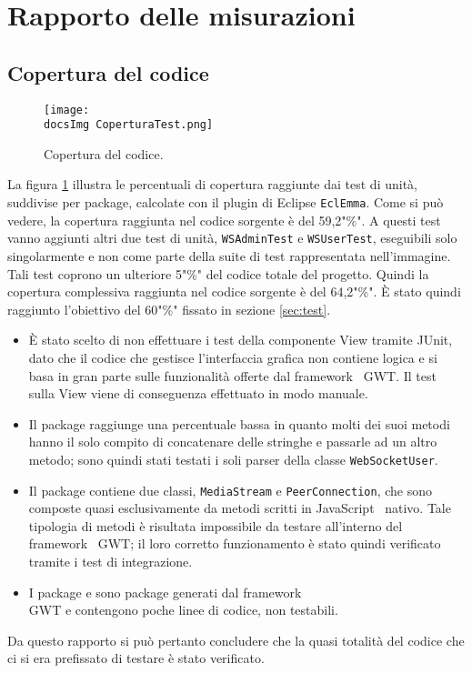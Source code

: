 \section{Rapporto delle misurazioni}{
\subsection{Copertura del codice}

\begin{figure}[h!]
	\centering
	\texttt{[image: \\docsImg CoperturaTest.png]}
	\caption{Copertura del codice.}
	\label{fig:copCod} 
\end{figure}

La figura \ref{fig:copCod} illustra le percentuali di copertura raggiunte dai test di unità, suddivise per package, calcolate con il plugin di Eclipse \texttt{EclEmma}. Come si può vedere, la copertura raggiunta nel codice sorgente è del 59,2"\%". A questi test vanno aggiunti altri due test di unità, \texttt{WSAdminTest} e \texttt{WSUserTest}, eseguibili solo singolarmente e non come parte della suite di test rappresentata nell'immagine. Tali test coprono un ulteriore 5"\%" del codice totale del progetto. Quindi la copertura complessiva raggiunta nel codice sorgente è del 64,2"\%". \`E stato quindi raggiunto l'obiettivo del 60"\%" fissato in sezione \ref{sec:test}.
\begin{itemize}
	\item \`E stato scelto di non effettuare i test della componente View tramite JUnit, dato che il codice che gestisce l'interfaccia grafica non contiene logica e si basa in gran parte sulle funzionalità offerte dal framework\g~ GWT. Il test sulla View viene di conseguenza effettuato in modo manuale.
	\item Il package  raggiunge una percentuale bassa in quanto molti dei suoi metodi hanno il solo compito di concatenare delle stringhe e passarle ad un altro metodo; sono quindi stati testati i soli parser della classe \texttt{WebSocketUser}.
	\item Il package  contiene due classi, \texttt{MediaStream} e \texttt{PeerConnection}, che sono composte quasi esclusivamente da metodi scritti in JavaScript\g~ nativo. Tale tipologia di metodi è risultata impossibile da testare all'interno del framework\g~ GWT; il loro corretto funzionamento è stato quindi verificato tramite i test di integrazione.
	\item I package  e  sono package generati dal framework\g~ \\GWT e contengono poche linee di codice, non testabili.
\end{itemize}
Da questo rapporto si può pertanto concludere che la quasi totalità del codice che ci si era prefissato di testare è stato verificato.
\newpage
}
